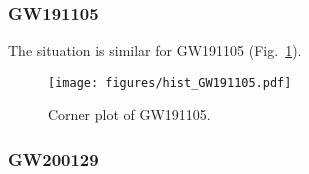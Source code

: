 \documentclass[aps,prd,twocolumn,superscriptaddress,preprintnumbers,floatfix,nofootinbib]{revtex4-2}
\begin{document}
% 
% 
\subsubsection{GW191105}
\label{sec:GW191105}

The situation is similar for GW191105 (Fig.~\ref{fig:corner_GW191105}).

\begin{figure}[h]
    \texttt{[image: figures/hist\_GW191105.pdf]}
    \caption{
        Corner plot of GW191105.
    }
    \label{fig:corner_GW191105}
\end{figure}


\subsubsection{GW200129}
\label{sec:GW200129}
\end{document}

